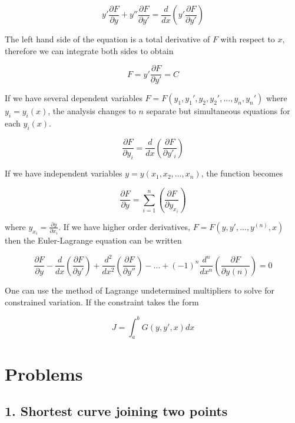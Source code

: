 \documentclass{tufte-book}
\newcommand{\pfrac}[2]{\frac{\partial {#1} }{\partial {#2} }}
\begin{document}
\begin{equation}
	\label{eq:10}
	y'\pfrac{F}{y} + y''\pfrac{F}{y'} = \frac{d}{dx}\left(y'\pfrac{F}{y'}\right)
\end{equation}

The left hand side of the equation is a total derivative of $F$ with respect to $x$, therefore we can integrate both sides to obtain

\begin{equation}
	\label{eq:el3}
	F = y'\pfrac{F}{y'} = C
\end{equation}

If we have several dependent variables $F = F(y_1, y_1', y_2, y_2', ..., y_n, y_n')$ where $y_i = y_i(x)$, the analysis changes to $n$ separate but simultaneous equations for each $y_i(x)$.

\begin{equation}
	\label{eq:el4}
	\pfrac{F}{y_i} = \frac{d}{dx}\left(\pfrac{F}{y'_i}\right)
\end{equation}

If we have independent variables $y = y(x_1, x_2, ..., x_n)$, the function becomes

\begin{equation}
	\label{eq:el5}
	\pfrac{F}{y} = \sum^n_{i=1}\left(\pfrac{F}{y_{x_i}}\right)
\end{equation}

where $y_{x_i} = \pfrac{y}{x_i}$. If we have higher order derivatives, $F = F(y, y', ..., y^{(n)}, x)$ then the Euler-Lagrange equation can be written

\begin{equation}
	\label{eq:el6}
	\pfrac{F}{y} - \frac{d}{dx}\left(\pfrac{F}{y'}\right) + \frac{d^2}{dx^2}\left(\pfrac{F}{y''}\right) - ... + (-1)^n \frac{d^n}{dx^n}\left(\pfrac{F}{y^{}(n)}\right) = 0
\end{equation}


One can use the method of Lagrange undetermined multipliers to solve for constrained variation. If the constraint takes the form

\begin{equation}
	\label{eq:11}
	J = \int^b_a G(y, y', x)dx
\end{equation}

\section{Problems}
\subsection{1. Shortest curve joining two points}
\end{document}
